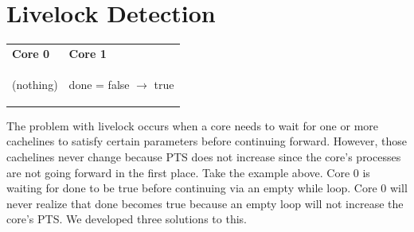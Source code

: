 \documentclass[12pt]{article}
\begin{document}
\section{Livelock Detection}

\begin{center}
	
	\begin{tabular}{p{5cm} p{5cm}}
		\textbf{Core 0} & \textbf{Core 1} \\
		\begin{algorithm}[H]
			\While{!done}
			{(nothing)}
			
		\end{algorithm}
		&
		\begin{algorithm}[H]
			done = false $\rightarrow$  true
		\end{algorithm}
		\\
	\end{tabular}
	
\end{center}

The problem with livelock occurs when a core needs to wait for one or more cachelines to satisfy certain parameters before continuing forward. However, those cachelines never change because PTS does not increase since the core’s processes are not going forward in the first place. Take  the example above. Core 0 is waiting for done to be true before continuing via an empty while loop. Core 0 will never realize that done becomes true because an empty loop will not increase the core’s PTS. We developed three solutions to this.
\end{document}
